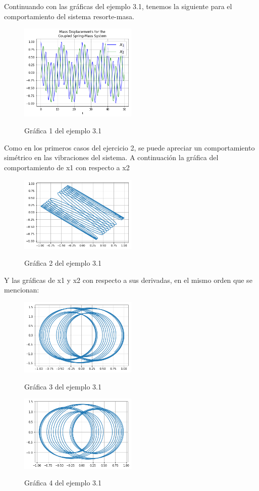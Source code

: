 \documentclass{article}
\begin{document}
Continuando con las gráficas del ejemplo 3.1, tenemos la siguiente para el comportamiento del sistema resorte-masa.
\begin{figure}[H]
    \caption{Gráfica 1 del ejemplo 3.1}
    \includegraphics[width=0.5\textwidth]{Grafica14.png}
    \centering
    \label{Cod}
\end{figure}
Como en los primeros casos del ejercicio 2, se puede apreciar un comportamiento simétrico en las vibraciones del sistema.
A continuación la gráfica del comportamiento de x1 con respecto a x2
\begin{figure}[H]
    \caption{Gráfica 2 del ejemplo 3.1}
    \includegraphics[width=0.5\textwidth]{Grafica15.png}
    \centering
    \label{Cod}
\end{figure}
Y las gráficas de x1 y x2 con respecto a sus derivadas, en el mismo orden que se mencionan:
\begin{figure}[H]
    \caption{Gráfica 3 del ejemplo 3.1}
    \includegraphics[width=0.5\textwidth]{Grafica16.png}
    \centering
    \label{Cod}
\end{figure}
\begin{figure}[H]
    \caption{Gráfica 4 del ejemplo 3.1}
    \includegraphics[width=0.5\textwidth]{Grafica17.png}
    \centering
    \label{Cod}
\end{figure}
\end{document}
